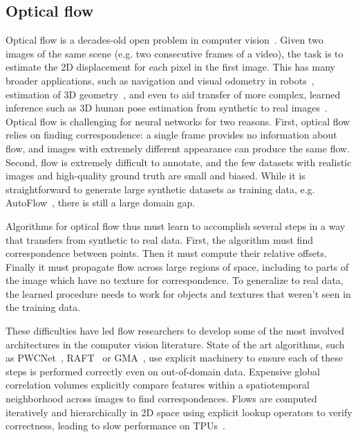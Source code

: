 \documentclass{article} %
\begin{document}
\subsection{Optical flow}
\label{sec:flow}

Optical flow is a decades-old open problem in computer vision~\citep{lucas1981iterative,horn1981determining}. Given two images of the same scene (e.g. two consecutive frames of a video), the task is to estimate the 2D displacement for each pixel in the first image.  This has many broader applications, such as navigation and visual odometry in robots~\citep{campbell2004techniques}, estimation of 3D geometry~\citep{ranftl2020towards}, and even to aid transfer of more complex, learned inference such as 3D human pose estimation from synthetic to real images~\citep{doersch2019sim2real}.
Optical flow is challenging for neural networks for two reasons.  First, optical flow relies on finding correspondence: a single frame provides no information about flow, and images with extremely different appearance can produce the same flow.  Second, flow is extremely difficult to annotate, and the few datasets with realistic images and high-quality ground truth are small and biased.  While it is straightforward to generate large synthetic datasets as training data, e.g. AutoFlow~\citep{sun2021autoflow}, there is still a large domain gap.

Algorithms for optical flow thus must learn to accomplish several steps in a way that transfers from synthetic to real data. First, the algorithm must find correspondence between points. Then it must compute their relative offsets. Finally it must propagate flow across large regions of space, including to parts of the image which have no texture for correspondence. To generalize to real data, the learned procedure needs to work for objects and textures that weren't seen in the training data.

These difficulties have led flow researchers to develop some of the most involved architectures in the computer vision literature. State of the art algorithms, such as PWCNet~\citep{sun2018pwc}, RAFT~\citep{teed2020raft} or GMA~\citep{jiang2021learning}, use explicit machinery to ensure each of these steps is performed correctly even on out-of-domain data.  Expensive global correlation volumes explicitly compare features within a spatiotemporal neighborhood across images to find correspondences. Flows are computed iteratively and hierarchically in 2D space using explicit lookup operators to verify correctness, leading to slow performance on TPUs~\citep{jouppi2017datacenter}.
\end{document}
